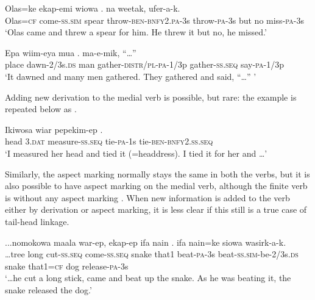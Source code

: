 \ea%
\label{ex:8:x1513}
\gll Olas=ke  ekap-emi  wiowa  .   na  weetak,  ufer-a-k. \\
Olas=\textsc{cf}  come-\textsc{ss}.\textsc{sim} spear throw-\textsc{ben}-\textsc{bnfy}2.\textsc{pa}-3s throw-\textsc{pa}-3s  but  no  miss-\textsc{pa}-3s     \\
\glt`Olas came and threw a spear for him. He threw it but no, he missed.'
\z


\ea%
\label{ex:8:x1514}
\gll Epa  wiim-eya  mua  .   ma-e-mik,  ``{\dots''}\\
place  dawn-2/3s.\textsc{ds} man  gather-\textsc{distr}/\textsc{pl}-\textsc{pa}-1/3p gather-\textsc{ss}.\textsc{seq} say-\textsc{pa}-1/3p\\
\glt`It dawned and many men gathered. They gathered and said, ``{\dots}'' '
\z


Adding new derivation to the medial verb is possible, but rare: the example  is repeated below as .

\ea%
\label{ex:8:x1515}
\gll Ikiwosa  wiar  pepekim-ep  .   \\
head  3.\textsc{dat} measure-\textsc{ss}.\textsc{seq} tie-\textsc{pa}-1s  tie-\textsc{ben}-\textsc{bnfy}2.\textsc{ss}.\textsc{seq}\\
\glt`I measured her head and tied it (=headdress). I tied it for her and {\dots}'
\z


 Similarly, the aspect marking normally stays the same in both the verbs, but it is also possible to have aspect marking on the medial verb, although the finite verb is without any aspect marking . When new information is added to the verb either by derivation or aspect marking, it is less clear if this still is a true case of tail-head linkage.  

\ea%
\label{ex:8:x1516}
\gll ...nomokowa  maala  war-ep,  ekap-ep  ifa  nain .    ifa  nain=ke siowa  wasirk-a-k.\\
{\dots}tree  long  cut-\textsc{ss}.\textsc{seq} come-\textsc{ss}.\textsc{seq} snake  that1 beat-\textsc{pa}-3s beat-\textsc{ss}.\textsc{sim}-be-2/3s.\textsc{ds} snake  that1=\textsc{cf} dog  release-\textsc{pa}-3s\\
\glt`{\dots}he cut a long stick, came and beat up the snake. As he was beating it, the snake released the dog.'
\z



